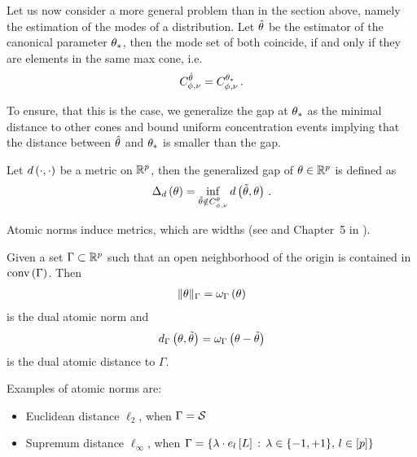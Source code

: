 
Let us now consider a more general problem than in the section above, namely the estimation of the modes of a distribution.
Let $\hat{\theta}$ be the estimator of the canonical parameter $\theta_{*}$, then the mode set of both coincide, if and only if they are elements in the same max cone, i.e.
\begin{align*}
    C_{\phi,\nu}^{\hat{\theta}} = C_{\phi,\nu}^{\theta_{*}} \, .
\end{align*}

To ensure, that this is the case, we generalize the gap at $\theta_{*}$ as the minimal distance to other cones and bound uniform concentration events implying that the distance between $\hat{\theta}$ and $\theta_{*}$ is smaller than the gap.

\begin{definition}
    Let $d\left(\cdot,\cdot\right)$ be a metric on $\mathbb{R}^{p}$, then the generalized gap of $\theta\in\mathbb{R}^{p}$ is defined as
    \begin{align*}
        \Delta_{d}\left(\theta\right) = \inf_{\tilde{\theta}\notin C_{\phi,\nu}^{\theta}} d\left(\tilde{\theta},\theta\right) \, .
    \end{align*}
\end{definition}

Atomic norms induce metrics, which are widths (see \cite{chandrasekaran_convex_2012} and Chapter~5 in \cite{goesmann_uniform_2021}).

\begin{definition}
    Given a set $\Gamma\subset\mathbb{R}^{p}$ such that an open neighborhood of the origin is contained in $\mathrm{conv}\left(\Gamma\right)$.
    Then
    \begin{align*}
        \|\theta\|_{\Gamma} = \omega_{\Gamma}\left(\theta\right)
    \end{align*}
    is the dual atomic norm and
    \begin{align*}
        d_{\Gamma}\left(\theta,\tilde{\theta}\right) = \omega_{\Gamma}\left(\theta-\tilde{\theta}\right)
    \end{align*}
    is the dual atomic distance to $\Gamma$.
\end{definition}

Examples of atomic norms are:
\begin{itemize}
    \item Euclidean distance $\ell_2$, when $\Gamma=\mathcal{S}$
    \item Supremum distance $\ell_{\infty}$, when $\Gamma=\{\lambda\cdot e_{l}\left[L\right] \,:\, \lambda\in\{-1,+1\},\, l\in[p]\}$
\end{itemize}


